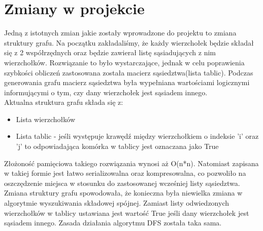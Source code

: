 
\section{Zmiany w projekcie}
	\label{final:zmiany}

	Jedną z istotnych zmian jakie zostały wprowadzone do projektu to zmiana struktury grafu. Na początku zakładaliśmy, że każdy wierzchołek będzie składał się z 2 współrzędnych oraz będzie zawierał listę sąsiadujących z nim wierzchołków. Rozwiązanie to było wystarczające, jednak w celu poprawienia szybkości obliczeń zastosowana została macierz sąsiedztwa(lista tablic). Podczas generowania grafu macierz sąsiedztwa była wypełniana wartościami logicznymi informującymi o tym, czy dany wierzchołek jest sąsiadem innego.\\
	Aktualna struktura grafu składa się z:
	\begin{itemize}
		\item Lista wierzchołków
		\item Lista tablic - jeśli występuje krawędź między wierzchołkiem o indeksie 'i' oraz 'j' to odpowiadająca komórka w tablicy jest oznaczana jako True
	\end{itemize}
	
	Złożoność pamięciowa takiego rozwiązania wynosi aż O(n*n). Natomiast zapisana w takiej formie jest łatwo serializowalna oraz kompresowalna, co pozwoliło na oszczędzenie miejsca w stosunku do zastosowanej wcześniej listy sąsiedztwa.\\
	Zmiana struktury grafu spowodowała, że konieczna była niewielka zmiana w algorytmie wyszukiwania składowej spójnej. Zamiast listy odwiedzonych wierzchołków w tablicy ustawiana jest wartość True jeśli dany wierzchołek jest sąsiadem innego. Zasada działania algorytmu DFS została taka sama.
